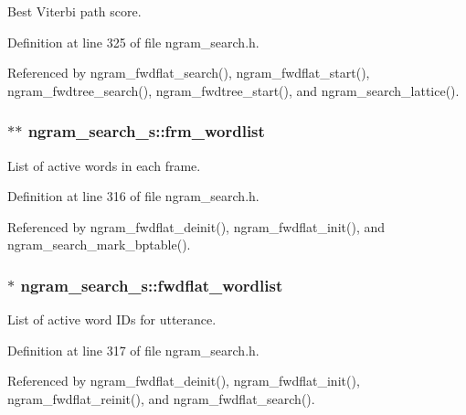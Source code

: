 \-Best \-Viterbi path score. 



\-Definition at line 325 of file ngram\-\_\-search.\-h.



\-Referenced by ngram\-\_\-fwdflat\-\_\-search(), ngram\-\_\-fwdflat\-\_\-start(), ngram\-\_\-fwdtree\-\_\-search(), ngram\-\_\-fwdtree\-\_\-start(), and ngram\-\_\-search\-\_\-lattice().

\subsubsection[{frm\-\_\-wordlist}]{$\ast$$\ast$ {\bf ngram\-\_\-search\-\_\-s\-::frm\-\_\-wordlist}}\label{structngram__search__s_aa54544457c363ccccb87fc7ec63a5f3e}


\-List of active words in each frame. 



\-Definition at line 316 of file ngram\-\_\-search.\-h.



\-Referenced by ngram\-\_\-fwdflat\-\_\-deinit(), ngram\-\_\-fwdflat\-\_\-init(), and ngram\-\_\-search\-\_\-mark\-\_\-bptable().

\subsubsection[{fwdflat\-\_\-wordlist}]{$\ast$ {\bf ngram\-\_\-search\-\_\-s\-::fwdflat\-\_\-wordlist}}\label{structngram__search__s_a774f1640c5ece856f4bef98d98e7c959}


\-List of active word \-I\-Ds for utterance. 



\-Definition at line 317 of file ngram\-\_\-search.\-h.



\-Referenced by ngram\-\_\-fwdflat\-\_\-deinit(), ngram\-\_\-fwdflat\-\_\-init(), ngram\-\_\-fwdflat\-\_\-reinit(), and ngram\-\_\-fwdflat\-\_\-search().


